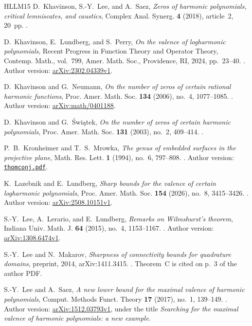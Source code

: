 \documentclass[UTF8,11pt]{ctexart}
\theoremstyle{definition}
\numberwithin{equation}{section}
\begin{document}
\begin{thebibliography}{HLLM15}
D.~Khavinson, S.-Y.~Lee, and A.~Saez,
\emph{Zeros of harmonic polynomials, critical lemniscates, and caustics},
Complex Anal. Synerg. \textbf{4} (2018), article~2, 20~pp.
.

D.~Khavinson, E.~Lundberg, and S.~Perry,
\emph{On the valence of logharmonic polynomials},
Recent Progress in Function Theory and Operator Theory,
Contemp. Math., vol.~799, Amer. Math. Soc., Providence, RI, 2024, pp.~23--40.
.
Author version: \href{https://arxiv.org/abs/2302.04339v1}{arXiv:2302.04339v1}.

D.~Khavinson and G.~Neumann,
\emph{On the number of zeros of certain rational harmonic functions},
Proc. Amer. Math. Soc. \textbf{134} (2006), no.~4, 1077--1085.
.
Author version: \href{https://arxiv.org/abs/math/0401188}{arXiv:math/0401188}.

D.~Khavinson and G.~\'{S}wi\k{a}tek,
\emph{On the number of zeros of certain harmonic polynomials},
Proc. Amer. Math. Soc. \textbf{131} (2003), no.~2, 409--414.
.

P.~B.~Kronheimer and T.~S.~Mrowka,
\emph{The genus of embedded surfaces in the projective plane},
Math. Res. Lett. \textbf{1} (1994), no.~6, 797--808.
.
Author version: \href{https://people.math.harvard.edu/~kronheim/thomconj.pdf}
{\texttt{thomconj.pdf}}.

K.~Lazebnik and E.~Lundberg,
\emph{Sharp bounds for the valence of certain logharmonic polynomials},
Proc. Amer. Math. Soc. \textbf{154} (2026), no.~8, 3415--3426.
.
Author version: \href{https://arxiv.org/abs/2508.10151v1}{arXiv:2508.10151v1}.

S.-Y.~Lee, A.~Lerario, and E.~Lundberg,
\emph{Remarks on Wilmshurst's theorem},
Indiana Univ. Math. J. \textbf{64} (2015), no.~4, 1153--1167.
.
Author version: \href{https://arxiv.org/abs/1308.6474v1}{arXiv:1308.6474v1}.

S.-Y.~Lee and N.~Makarov,
\emph{Sharpness of connectivity bounds for quadrature domains},
preprint, 2014, arXiv:1411.3415.
.
Theorem~C is cited on p.~3 of the author PDF.

S.-Y.~Lee and A.~Saez,
\emph{A new lower bound for the maximal valence of harmonic polynomials},
Comput. Methods Funct. Theory \textbf{17} (2017), no.~1, 139--149.
.
Author version: \href{https://arxiv.org/abs/1512.03793v1}{arXiv:1512.03793v1},
under the title \emph{Searching for the maximal valence of harmonic
polynomials: a new example}.


\end{thebibliography}
\end{document}
